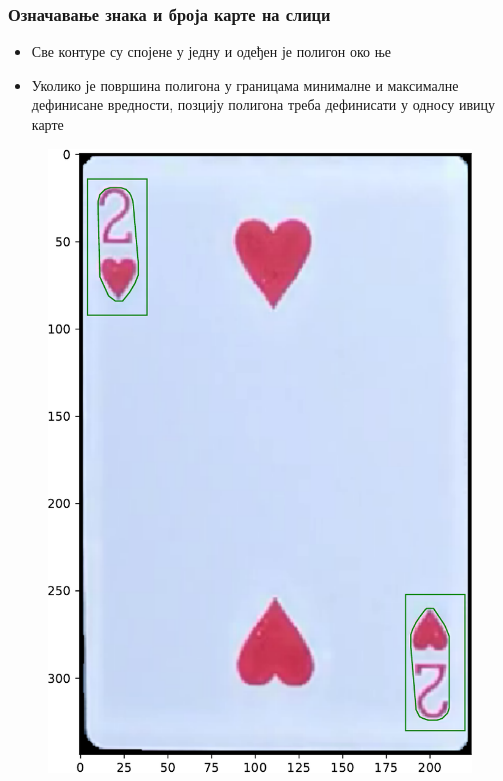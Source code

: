 \begin{frame}
\frametitle{Означавање знака и броја карте на слици}
\begin{itemize}
 \item Све контуре су спојене у једну и одеђен је полигон око ње
 \item Уколико је површина полигона у границама минималне и
 максималне дефинисане вредности, позцију полигона треба дефинисати
 у односу ивицу карте
\end{itemize}
\begin{figure}[H]
  \centering
      \includegraphics[scale=0.28]{slike/kartaHull.pdf}
 \end{figure}
\end{frame}
